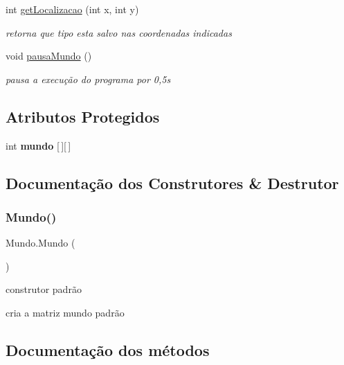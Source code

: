 \begin{DoxyCompactItemize}
\mbox{\label{class_mundo_ac971ab63c34c7ab0c00df63277589338}} 
int \mbox{\hyperlink{class_mundo_ac971ab63c34c7ab0c00df63277589338}{get\+Localizacao}} (int x, int y)
\begin{DoxyCompactList}\small\item\em retorna que tipo esta salvo nas coordenadas indicadas \end{DoxyCompactList}\item 
\mbox{\label{class_mundo_a871bfb3ebd38d8ce498777bb0dd1cdeb}} 
void \mbox{\hyperlink{class_mundo_a871bfb3ebd38d8ce498777bb0dd1cdeb}{pausa\+Mundo}} ()
\begin{DoxyCompactList}\small\item\em pausa a execução do programa por 0,5s \end{DoxyCompactList}\end{DoxyCompactItemize}
\subsection*{Atributos Protegidos}
\begin{DoxyCompactItemize}
\item 
\mbox{\label{class_mundo_a689dcc4a20afc97fc8a63907ab682d7e}} 
int {\bfseries mundo} \mbox{[}$\,$\mbox{]}\mbox{[}$\,$\mbox{]}
\end{DoxyCompactItemize}


\subsection{Documentação dos Construtores \& Destrutor}
\mbox{\label{class_mundo_ae3801a0a633ad3475456c67639561105}} 
\subsubsection{\texorpdfstring{Mundo()}{Mundo()}}
{\footnotesize\ttfamily Mundo.\+Mundo (\begin{DoxyParamCaption}{ }\end{DoxyParamCaption})}



construtor padrão 

cria a matriz mundo padrão 

\subsection{Documentação dos métodos}
\mbox{\label{class_mundo_adbafcb32f5f209eda97e1c7953c6e599}} 
